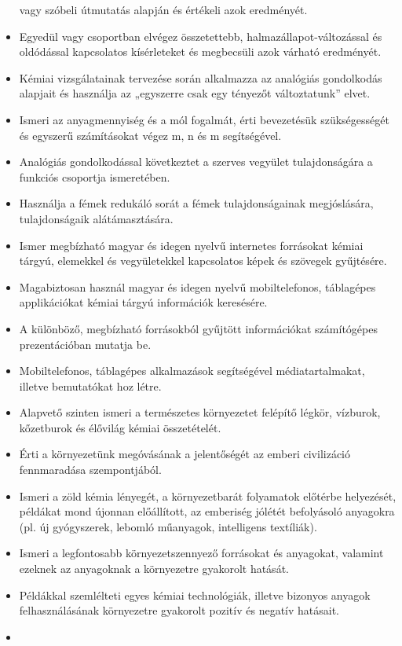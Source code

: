 \begin{itemize}
  vagy szóbeli útmutatás alapján és értékeli azok eredményét.
\item
  Egyedül vagy csoportban elvégez összetettebb,
  halmazállapot-változással és oldódással kapcsolatos kísérleteket és
  megbecsüli azok várható eredményét.
\item
  Kémiai vizsgálatainak tervezése során alkalmazza az analógiás
  gondolkodás alapjait és használja az „egyszerre csak egy tényezőt
  változtatunk'' elvet.
\item
  Ismeri az anyagmennyiség és a mól fogalmát, érti bevezetésük
  szükségességét és egyszerű számításokat végez m, n és m segítségével.
\item
  Analógiás gondolkodással következtet a szerves vegyület tulajdonságára
  a funkciós csoportja ismeretében.
\item
  Használja a fémek redukáló sorát a fémek tulajdonságainak
  megjóslására, tulajdonságaik alátámasztására.
\item
  Ismer megbízható magyar és idegen nyelvű internetes forrásokat kémiai
  tárgyú, elemekkel és vegyületekkel kapcsolatos képek és szövegek
  gyűjtésére.
\item
  Magabiztosan használ magyar és idegen nyelvű mobiltelefonos,
  táblagépes applikációkat kémiai tárgyú információk keresésére.
\item
  A különböző, megbízható forrásokból gyűjtött információkat
  számítógépes prezentációban mutatja be.
\item
  Mobiltelefonos, táblagépes alkalmazások segítségével médiatartalmakat,
  illetve bemutatókat hoz létre.
\item
  Alapvető szinten ismeri a természetes környezetet felépítő légkör,
  vízburok, kőzetburok és élővilág kémiai összetételét.
\item
  Érti a környezetünk megóvásának a jelentőségét az emberi civilizáció
  fennmaradása szempontjából.
\item
  Ismeri a zöld kémia lényegét, a környezetbarát folyamatok előtérbe
  helyezését, példákat mond újonnan előállított, az emberiség jólétét
  befolyásoló anyagokra (pl. új gyógyszerek, lebomló műanyagok,
  intelligens textíliák).
\item
  Ismeri a legfontosabb környezetszennyező forrásokat és anyagokat,
  valamint ezeknek az anyagoknak a környezetre gyakorolt hatását.
\item
  Példákkal szemlélteti egyes kémiai technológiák, illetve bizonyos
  anyagok felhasználásának környezetre gyakorolt pozitív és negatív
  hatásait.
\item

\end{itemize}
